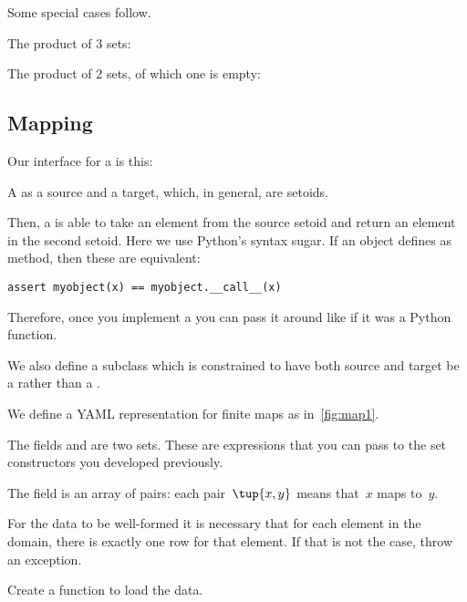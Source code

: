 Some special cases follow.

The product of 3 sets:

%

The product of 2 sets, of which one is empty:

%


\subsection{Mapping}

Our interface for a  is this:


A  as a source and a target, which, in general, are setoids.

Then, a  is able to take an element from the source setoid and return an element in the second setoid.
Here we use Python's syntax sugar. If an object defines as  method, then these are equivalent:

\begin{verbatim}
assert myobject(x) == myobject.__call__(x)
\end{verbatim}

Therefore, once you implement a  you can pass it around like if it was a Python function.

We also define a subclass  which is constrained to have both source and target be a \FiniteSet rather than a \Setoid.




We define a YAML representation for finite maps as in~\cref{fig:map1}.

The fields  and  are two sets. These are expressions that you can pass to the set constructors you developed previously.

The field  is an array of pairs: each pair~$\tup{x, y}$ means that~$x$ maps to~$y$.

For the data to be well-formed it is necessary that for each element in the domain, there is exactly one row for that element.
If that is not the case, throw an exception.



\begin{gradedexercise}[Representation]
  Create a function to load the data.


%

\end{gradedexercise}

